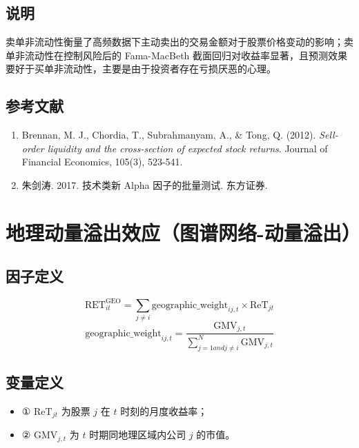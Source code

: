 \documentclass{article}
\begin{document}
\subsection{说明}
卖单非流动性衡量了高频数据下主动卖出的交易金额对于股票价格变动的影响；卖单非流动性在控制风险后的 Fama-MacBeth 截面回归对收益率显著，且预测效果要好于买单非流动性，主要是由于投资者存在亏损厌恶的心理。

\subsection{参考文献}
\begin{enumerate}
    \item Brennan, M. J., Chordia, T., Subrahmanyam, A., \& Tong, Q. (2012). \textit{Sell-order liquidity and the cross-section of expected stock returns}. Journal of Financial Economics, 105(3), 523-541.
    \item 朱剑涛. 2017. 技术类新 Alpha 因子的批量测试. 东方证券.
\end{enumerate}

\section{地理动量溢出效应（图谱网络-动量溢出）}

\subsection{因子定义}
\begin{equation}
    \mathrm{RET}_{it}^{\mathrm{GEO}} = \sum_{j \neq i} \mathrm{geographic\_weight}_{ij,t} \times \mathrm{Re T}_{jt}
\end{equation}
\begin{equation}
    \mathrm{geographic\_weight}_{ij,t} = \frac{\mathrm{GMV}_{j,t}}{\sum_{j=1 and j \neq i}^N \mathrm{GMV}_{j,t}}
\end{equation}

\subsection{变量定义}
\begin{itemize}
    \item ① \( \mathrm{ReT}_{jt} \) 为股票 \( j \) 在 \( t \) 时刻的月度收益率；
    \item ② \( \mathrm{GMV}_{j,t} \) 为 \( t \) 时期同地理区域内公司 \( j \) 的市值。
\end{itemize}
\end{document}
